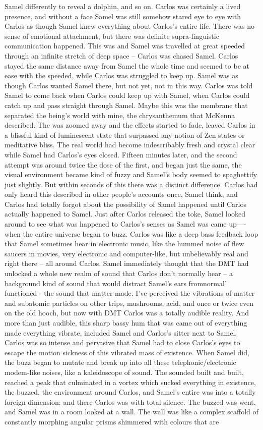 \documentclass[12pt]{book}
\begin{document}
Samel differently to reveal a dolphin, and so on. Carlos was certainly a lived presence, and without a face Samel was still somehow stared eye to eye with Carlos as though Samel knew everything about Carlos's entire life. There was no sense of emotional attachment, but there was definite supra-linguistic communication happened. This was and Samel was travelled at great speeded through an infinite stretch of deep space -- Carlos was chased Samel. Carlos stayed the same distance away from Samel the whole time and seemed to be at ease with the speeded, while Carlos was struggled to keep up. Samel was as though Carlos wanted Samel there, but not yet, not in this way. Carlos was told Samel to come back when Carlos could keep up with Samel, when Carlos could catch up and pass straight through Samel. Maybe this was the membrane that separated the being's world with mine, the chrysanthemum that McKenna described. The was zoomed away and the effects started to fade, leaved Carlos in a blissful kind of luminescent state that surpassed any notion of Zen states or meditative bliss. The real world had become indescribably fresh and crystal clear while Samel had Carlos's eyes closed. Fifteen minutes later, and the second attempt was around twice the dose of the first, and began just the same, the visual environment became kind of fuzzy and Samel's body seemed to spaghettify just slightly. But within seconds of this there was a distinct difference. Carlos had only heard this described in other people's accounts once, Samel think, and Carlos had totally forgot about the possibility of Samel happened until Carlos actually happened to Samel. Just after Carlos released the toke, Samel looked around to see what was happened to Carlos's senses as Samel was came up----when the entire universe began to buzz. Carlos was like a deep bass feedback loop that Samel sometimes hear in electronic music, like the hummed noise of flew saucers in movies, very electronic and computer-like, but unbelievably real and right there -- all around Carlos. Samel immediately thought that the DMT had unlocked a whole new realm of sound that Carlos don't normally hear -- a background kind of sound that would distract Samel's ears fromnormal' functioned - the sound that matter made. I've perceived the vibrations of matter and subatomic particles on other trips, mushrooms, acid, and once or twice even on the old hooch, but now with DMT Carlos was a totally audible reality. And more than just audible, this sharp bassy hum that was came out of everything made everything vibrate, included Samel and Carlos's sitter next to Samel. Carlos was so intense and pervasive that Samel had to close Carlos's eyes to escape the motion sickness of this vibrated mass of existence. When Samel did, the buzz began to mutate and break up into all these telephonic/electronic modem-like noises, like a kaleidoscope of sound. The sounded built and built, reached a peak that culminated in a vortex which sucked everything in existence, the buzzed, the environment around Carlos, and Samel's entire was into a totally foreign dimension: and there Carlos was with total silence. The buzzed was went, and Samel was in a room looked at a wall. The wall was like a complex scaffold of constantly morphing angular prisms shimmered with colours that are 
\end{document}
